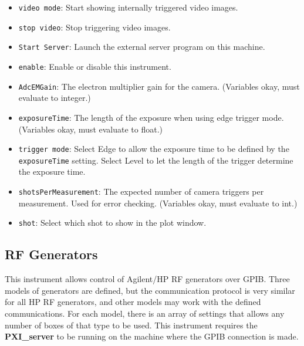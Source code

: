 \documentclass[pdftex,11pt,letterpaper]{article}
\begin{document}
\begin{itemize}
\item \texttt{video mode}:  Start showing internally triggered video images.
\item \texttt{stop video}:  Stop triggering video images.
\item \texttt{Start Server}:  Launch the external server program on this machine.
\item \texttt{enable}:  Enable or disable this instrument.
\item \texttt{AdcEMGain}:  The electron multiplier gain for the camera.  (Variables okay, must evaluate to integer.)
\item \texttt{exposureTime}:  The length of the exposure when using edge trigger mode.  (Variables okay, must evaluate to float.)
\item \texttt{trigger mode}:  Select Edge to allow the exposure time to be defined by the \texttt{exposureTime} setting.  Select Level to let the length of the trigger determine the exposure time.
\item \texttt{shotsPerMeasurement}:  The expected number of camera triggers per measurement.  Used for error checking.  (Variables okay, must evaluate to int.)
\item \texttt{shot}:  Select which shot to show in the plot window.
\end{itemize}

\subsection{RF Generators}

This instrument allows control of Agilent/HP RF generators over GPIB.  Three models of generators are defined, but the communication protocol is very similar for all HP RF generators, and other models may work with the defined communications.  For each model, there is an array of settings that allows any number of boxes of that type to be used.  This instrument requires the \textbf{PXI\_server} to be running on the machine where the GPIB connection is made.
\end{document}
